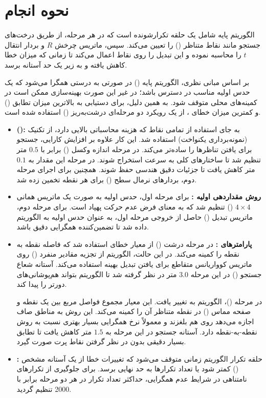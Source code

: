 \documentclass[12pt,a4paper]{article}
\begin{document}
	\section{نحوه انجام}
	الگوریتم پایه  شامل یک حلقه تکرارشونده است که در هر مرحله، از طریق درخت‌های جستجو مانند  نقاط متناظر () را تعیین می‌کند. سپس، ماتریس چرخش $R$ و بردار انتقال $t$ را محاسبه نموده و این تبدیل را روی نقاط اعمال می‌کند تا زمانی که میزان خطا کاهش یافته و به زیر یک حد آستانه برسد. 
	
	بر اساس مبانی نظری، الگوریتم پایه () در صورتی به درستی همگرا می‌شود که یک حدس اولیه مناسب در دسترس باشد؛ در غیر این صورت بهینه‌سازی ممکن است در کمینه‌های محلی متوقف شود. به همین دلیل، برای دستیابی به بالاترین میزان تطابق () و کمترین میزان خطای ، از یک رویکرد دو مرحله‌ای درشت‌به‌ریز () استفاده شده است.
	
	\begin{itemize}
		\item \textbf{ ():} به جای استفاده از تمامی نقاط که هزینه محاسباتی بالایی دارد، از تکنیک  (نمونه‌برداری یکنواخت) استفاده شد. این کار علاوه بر افزایش کارایی، جستجو برای یافتن تناظرها را ساده‌تر می‌کند. در مرحله  اندازه وکسل () برابر با $0.5$ متر تنظیم شد تا ساختارهای کلی به سرعت استخراج شوند. در مرحله  این مقدار به $0.1$ متر کاهش یافت تا جزئیات دقیق هندسی حفظ شوند. همچنین برای اجرای مرحله دوم، بردارهای نرمال سطح () برای هر نقطه تخمین زده شد.
		
		\item \textbf{روش مقداردهی اولیه :} برای مرحله اول، حدس اولیه به صورت یک ماتریس همانی $4 \times 4$ () تنظیم شد که به معنای فرض عدم حرکت پهپاد است. برای مرحله دوم، ماتریس تبدیل () حاصل از خروجی مرحله اول، به عنوان حدس اولیه به الگوریتم داده شد تا تضمین‌کننده همگرایی دقیق باشد.
		
		\item \textbf{پارامترهای :} در مرحله درشت () از معیار خطای  استفاده شد که فاصله نقطه به نقطه را کمینه می‌کند. در این حالت، الگوریتم از تجزیه مقادیر منفرد () روی ماتریس کوواریانس متقاطع برای یافتن تبدیل بهینه استفاده می‌کند. آستانه شعاع جستجو () در این مرحله $3.0$ متر در نظر گرفته شد تا الگوریتم بتواند هم‌پوشانی‌های دورتر را پیدا کند. 
		
		در مرحله ()، الگوریتم به  تغییر یافت. این معیار مجموع فواصل مربع بین یک نقطه و صفحه مماس () در نقطه متناظر آن را کمینه می‌کند. این روش به مناطق صاف اجازه می‌دهد روی هم بلغزند و معمولاً نرخ همگرایی بسیار بهتری نسبت به روش نقطه-به-نقطه دارد. آستانه جستجو در این مرحله به $1.5$ متر کاهش یافت تا تطابق بسیار دقیقی بدون در نظر گرفتن نقاط پرت صورت گیرد.
		
		\item \textbf{:} حلقه تکرار الگوریتم زمانی متوقف می‌شود که تغییرات خطا از یک آستانه مشخص () کمتر شود یا تعداد تکرارها به حد نهایی برسد. برای جلوگیری از تکرارهای نامتناهی در شرایط عدم همگرایی، حداکثر تعداد تکرار  در هر دو مرحله برابر با 2000 تنظیم گردید.
	\end{itemize}
\end{document}

